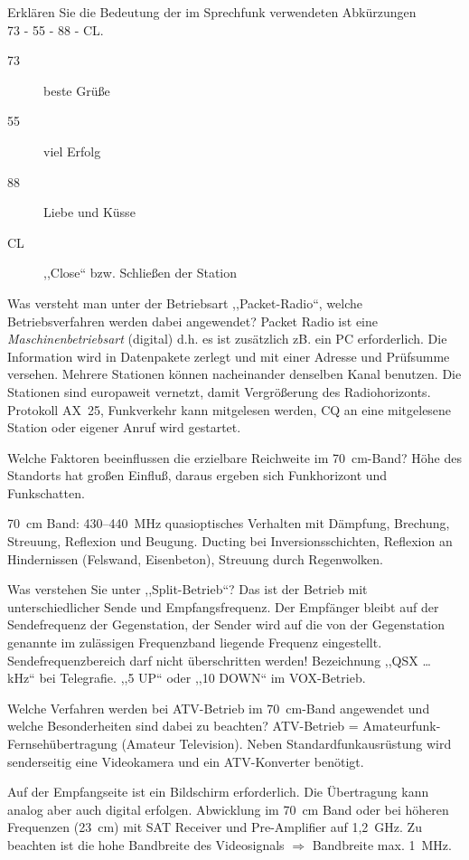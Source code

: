 \documentclass[avery5371,grid,frame,a4paper]{flashcards}
\newcommand{\card}[3]{
  \begin{flashcard}[{\chap} -- #1]{#2}#3\end{flashcard}
}
\begin{document}
\card{30}{Erklären Sie die Bedeutung der im Sprechfunk verwendeten Abkürzungen \\ 73 - 55 - 88 - CL.}{
  \begin{description}
    \item[73] beste Grüße
    \item[55] viel Erfolg
    \item[88] Liebe und Küsse
    \item[CL] ,,Close`` bzw. Schließen der Station
  \end{description}
}
\card{31}{Was versteht man unter der Betriebsart ,,Packet-Radio``, welche Betriebsverfahren werden dabei angewendet?}{
  Packet Radio ist eine \emph{Maschinenbetriebsart} (digital) d.h. es ist zusätzlich zB. ein PC erforderlich. Die Information wird in Datenpakete zerlegt und mit einer Adresse und Prüfsumme versehen. Mehrere Stationen können nacheinander denselben Kanal benutzen. Die Stationen sind europaweit vernetzt, damit Vergrößerung des Radiohorizonts. Protokoll AX~25, Funkverkehr kann mitgelesen werden, CQ an eine mitgelesene Station oder eigener Anruf wird gestartet.
}
\card{32}{Welche Faktoren beeinflussen die erzielbare Reichweite im 70~cm-Band?}{
  Höhe des Standorts hat großen Einfluß, daraus ergeben sich Funkhorizont und Funkschatten.

  70~cm Band: 430--440~MHz quasioptisches Verhalten mit Dämpfung, Brechung, Streuung, Reflexion und Beugung. Ducting bei Inversionsschichten, Reflexion an Hindernissen (Felswand, Eisenbeton), Streuung durch Regenwolken.
}
\card{33}{Was verstehen Sie unter ,,Split-Betrieb``?}{
  Das ist der Betrieb mit unterschiedlicher Sende und Empfangsfrequenz. Der Empfänger bleibt auf der Sendefrequenz der Gegenstation, der Sender wird auf die von der Gegenstation genannte im zulässigen Frequenzband liegende Frequenz eingestellt. Sendefrequenzbereich darf nicht überschritten werden! Bezeichnung ,,QSX \dots{} kHz`` bei Telegrafie. ,,5 UP`` oder ,,10 DOWN`` im VOX-Betrieb.
}
\card{34}{Welche Verfahren werden bei ATV-Betrieb im 70~cm-Band angewendet und welche Besonderheiten sind dabei zu beachten?}{
  ATV-Betrieb = Amateurfunk-Fernsehübertragung (Amateur Television). Neben Standardfunkausrüstung wird senderseitig eine Videokamera und ein ATV-Konverter benötigt.

  Auf der Empfangseite ist ein Bildschirm erforderlich. Die Übertragung kann analog aber auch digital erfolgen. Abwicklung im 70~cm Band oder bei höheren Frequenzen (23~cm) mit SAT Receiver und Pre-Amplifier auf 1,2~GHz. Zu beachten ist die hohe Bandbreite des Videosignals $\Rightarrow$ Bandbreite max. 1~MHz.
}
\end{document}
